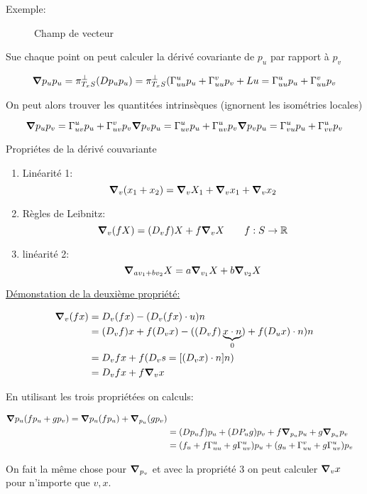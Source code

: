 Exemple:

\begin{figure}[ht]
    \centering
    \caption{Champ de vecteur}
    \label{fig:champ-de-vecteur}
\end{figure}

Sue chaque point on peut calculer la dérivé covariante de $p_{u}$ par rapport à $p_v$

$$\grad p_{u} p_{u} = \pi_{T_xS}^\perp (Dp_{u} p_{u}) = \pi_{T_xS}^\perp(\Gamma_{uu}^u p_{u} + \Gamma_{uu}^v p_{v} + Lu = \Gamma_{uu}^u p_{u} + \Gamma_{uu}^v p_v$$ 


On peut alors trouver les quantitées intrinsèques (ignornent les isométries locales)

$$\grad p_{u} p_{v} = \Gamma_{uv}^u p_{u} + \Gamma_{uv}^v p_{v}\\ \grad p_{v} p_{u} = \Gamma_{uv}^u p_{u} + \Gamma_{uv}^u p_{v}\\ \grad p_{v} p_{u} =\Gamma_{vu}^up_{u} + \Gamma_{vv}^u p_v$$ 

Propriétes de la dérivé couvariante

\begin{enumerate}
	\item Linéarité 1: $$\grad_{v} (x_{1} + x_{2}) = \grad_{v} X_{1} + \grad_{v} x_{1} + \grad_{v} x_{2} $$ 
	\item Règles de Leibnitz: $$\grad_{v} (fX) = (D_vf)X + f\grad_{v} X \qquad f: S\to \mathbb{R}$$ 
	\item linéarité 2: $$\grad_{av_1+bv_2} X = a \grad_{v_1}X + b\grad_{v_2} X $$ 
\end{enumerate}

\underline{Démonstation de la deuxième propriété:} 

$$\begin{aligned}
	\grad_{v} (fx) &= D_{v} (fx) -(D_{v} (fx)\cdot u)n\\ &=(D_{v} f)x +f(D_{v} x) - ((D_{v} f)\underbrace{x\cdot n}_0) + f(D_{u} x)\cdot n) n \\ &= D_{v} fx + f(D_{v} s = [(D_vx)\cdot n]n)\\&= D_{v} fx + f\grad_{v} x
\end{aligned}$$ 


En utilisant les trois propriétées on calculs:

$$\begin{aligned}
	\grad p_{u} (fp_{u} + g p_{v} ) = \grad p_{u} (f p_{u} ) + \grad_{p_u} (gp_v) \\ &= (Dp_{u} f)p_{u} + (DP_{u} g) p_{v} + f \grad_{p_{u}}  p_{u} + g \grad_{p_u} p_{v} \\ &= (f_{u} + f \Gamma_{uu}^u + g\Gamma_{uv}^u) p_{u} + (g_{u} + \Gamma_{uu}^v + g \Gamma_{uv}^u)p_v
\end{aligned}$$ 

On fait la même chose pour $\grad_{p_v}$ et avec la propriété 3 on peut calculer $\grad_{v} x$ pour n'importe que $v,x$. 



